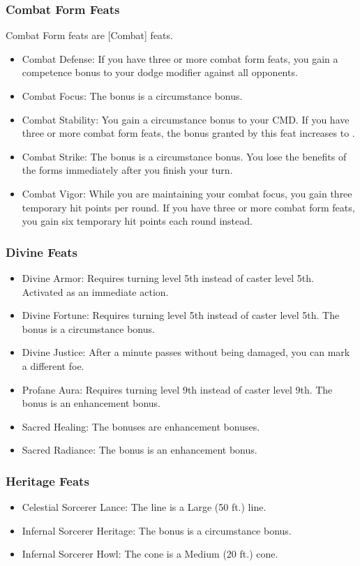 \subsubsection{Combat Form Feats}
Combat Form feats are [Combat] feats.
\begin{itemize}
\item Combat Defense: If you have three or more combat form feats, you gain a  competence bonus to your dodge modifier against all opponents.
\item Combat Focus: The bonus is a circumstance bonus.
\item Combat Stability: You gain a  circumstance bonus to your CMD. If you have three or more combat form feats, the bonus granted by this feat increases to .
\item Combat Strike: The bonus is a circumstance bonus. You lose the benefits of the forms immediately after you finish your turn.
\item Combat Vigor: While you are maintaining your combat focus, you gain three temporary hit points per round. If you have three or more combat form feats, you gain six temporary hit points each round instead.
\end{itemize}
\subsubsection{Divine Feats}
\begin{itemize}
\item Divine Armor: Requires turning level 5th instead of caster level 5th. Activated as an immediate action.
\item Divine Fortune: Requires turning level 5th instead of caster level 5th. The bonus is a circumstance bonus.
\item Divine Justice: After a minute passes without being damaged, you can mark a different foe.
\item Profane Aura: Requires turning level 9th instead of caster level 9th. The bonus is an enhancement bonus.
\item Sacred Healing: The bonuses are enhancement bonuses.
\item Sacred Radiance: The bonus is an enhancement bonus.
\end{itemize}
\subsubsection{Heritage Feats}
\begin{itemize}
\item Celestial Sorcerer Lance: The line is a Large (50 ft.) line.
\item Infernal Sorcerer Heritage: The bonus is a circumstance bonus.
\item Infernal Sorcerer Howl: The cone is a Medium (20 ft.) cone.
\end{itemize}
